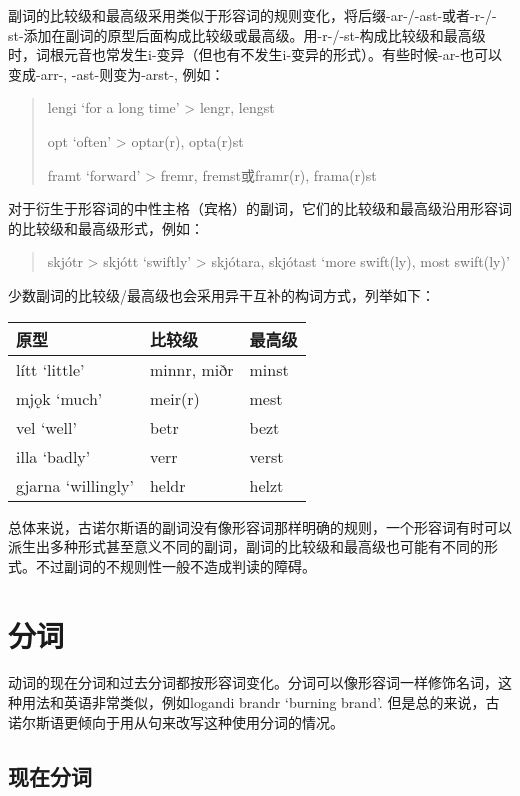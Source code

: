 副词的比较级和最高级采用类似于形容词的规则变化，将后缀-ar-/-ast-或者-r-/-st-添加在副词的原型后面构成比较级或最高级。用-r-/-st-构成比较级和最高级时，词根元音也常发生i-变异（但也有不发生i-变异的形式）。有些时候-ar-也可以变成-arr-, -ast-则变为-arst-, 例如：

\begin{quote}
    lengi `for a long time' > lengr, lengst

    opt `often' > optar(r), opta(r)st

    framt `forward' > fremr, fremst或framr(r), frama(r)st
\end{quote}

对于衍生于形容词的中性主格（宾格）的副词，它们的比较级和最高级沿用形容词的比较级和最高级形式，例如：
\begin{quote}
    skjótr > skjótt `swiftly' > skjótara, skjótast `more swift(ly), most swift(ly)'
\end{quote}

少数副词的比较级/最高级也会采用异干互补的构词方式，列举如下：

\begin{longtable}{lll}
    \toprule
    原型               & 比较级      & 最高级 \\
    \midrule
    \endhead
    \bottomrule
    \endfoot
    lítt `little‌'      & minnr, miðr & minst  \\
    mjǫk `much‌'        & meir(r)     & mest   \\
    vel `well‌'         & betr        & bezt   \\
    illa `badly‌'       & verr        & verst  \\
    gjarna `willingly‌' & heldr       & helzt  \\
\end{longtable}

总体来说，古诺尔斯语的副词没有像形容词那样明确的规则，一个形容词有时可以派生出多种形式甚至意义不同的副词，副词的比较级和最高级也可能有不同的形式。不过副词的不规则性一般不造成判读的障碍。

\section{分词}\label{分词}

动词的现在分词和过去分词都按形容词变化。分词可以像形容词一样修饰名词，这种用法和英语非常类似，例如logandi brandr `burning brand‌'.
但是总的来说，古诺尔斯语更倾向于用从句来改写这种使用分词的情况。

\subsection{现在分词}\label{现在分词}

